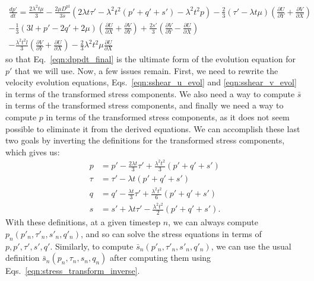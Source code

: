 \documentclass[11pt]{article}
\newcommand{\p}{\partial}
\newcommand{\Dpl}{D^\text{pl}}
\begin{document}
\begin{multline}
    \frac{dp'}{dt} = \frac{2\lambda^2t\mu}{3} - \frac{2\mu\Dpl}{3\bar{s}}(2 \lambda t \tau' - \lambda^2 t^2(p' + q' + s') - \lambda^2 t^2 p) - \frac{2}{3}(\tau' - \lambda t\mu)\left(\frac{\p U}{\p Y} + \frac{\p V}{\p X}\right)\\
    - \frac{1}{3}(3l + p' - 2q' + 2\mu)\left(\frac{\p U}{\p X} + \frac{\p V}{\p Y}\right) + \frac{2s'}{3}\left(\frac{\p V}{\p Y} - \frac{\p U}{\p X}\right)\\
    - \frac{\lambda^2t^2l}{3}\left(\frac{\p V}{\p Y} + \frac{\p U}{\p X}\right) - \frac{2}{3}\lambda^2t^2\mu\frac{\p U}{\p X}
    \label{eqn:dppdt_final}
\end{multline}
so that Eq.~\ref{eqn:dppdt_final} is the ultimate form of the evolution equation for $p'$ that we will use. Now, a few issues remain. First, we need to rewrite the velocity evolution equations, Eqs.~\ref{eqn:sshear_u_evol} and \ref{eqn:sshear_v_evol} in terms of the transformed stress components. We also need a way to compute $\bar{s}$ in terms of the transformed stress components, and finally we need a way to compute $p$ in terms of the transformed stress components, as it does not seem possible to eliminate it from the derived equations. We can accomplish these last two goals by inverting the definitions for the transformed stress components, which gives us:
\begin{align}
    p    &= p' - \frac{2\lambda t}{3}\tau' + \frac{\lambda^2 t^2}{3}(p' + q' + s')\\
    \tau &= \tau' - \lambda t (p' + q' + s')\\
    q    &= q' - \frac{\lambda t}{3}\tau' + \frac{\lambda^2 t^2}{6}(p' + q' + s')\\
    s    &= s' + \lambda t \tau' - \frac{\lambda^2 t^2}{2}(p' + q' + s').
    \label{eqn:stress_transform_inverse}
\end{align}
With these definitions, at a given timestep $n$, we can always compute $p_n(p'_n, \tau'_n, s'_n, q'_n)$, and so can solve the stress equations in terms of $p, p', \tau', s', q'$. Similarly, to compute $\bar{s}_n(p'_n, \tau'_n, s'_n, q'_n)$, we can use the usual definition $\bar{s}_n(p_n, \tau_n, s_n, q_n)$ after computing them using Eqs.~\ref{eqn:stress_transform_inverse}. 
\end{document}
